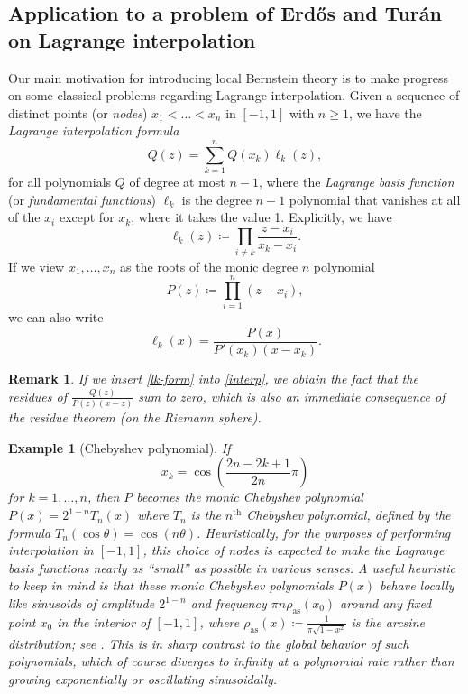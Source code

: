 \documentclass[12pt]{amsart}
\newtheorem{remark}[theorem]{Remark}
\newtheorem{example}[theorem]{Example}
\begin{document}
\subsection{Application to a problem of Erd\H{o}s and Tur\'an on Lagrange interpolation}

Our main motivation for introducing local Bernstein theory is to make progress on some classical problems regarding Lagrange interpolation.
Given a sequence of distinct points (or \emph{nodes}) $x_1 < \dots <x_n$ in $[-1, 1]$ with $n \geq 1$, we have the \emph{Lagrange
interpolation formula}
\begin{equation}\label{interp}
Q(z) = \sum_{k=1}^n Q(x_k) \ell_k(z),
\end{equation}
for all polynomials $Q$ of degree at most $n-1$, where the \emph{Lagrange basis function} (or \emph{fundamental functions}) $\ell_k$ is the
degree $n-1$ polynomial that vanishes at all of the $x_i$ except for $x_k$, where it takes the value
1. Explicitly, we have
\begin{equation}\label{lk-def}
\ell_k(z) \coloneqq \prod_{i \neq k} \frac{z - x_i}{x_k - x_i}.
\end{equation}
If we view $x_1,\dots,x_n$ as the roots of the monic degree $n$ polynomial
\begin{equation}\label{poly-def}
    P(z) \coloneqq \prod_{i=1}^n (z - x_i),
\end{equation}
we can also write
\begin{equation}\label{lk-form}
 \ell_k(x) = \frac{P(x)}{P'(x_k) (x-x_k)}.
\end{equation}

\begin{remark}\label{res} If we insert \eqref{lk-form} into \eqref{interp}, we obtain the fact that the residues of $\frac{Q(z)}{P(z) (x-z)}$ sum to zero, which is also an immediate consequence of the residue theorem (on the Riemann sphere).
\end{remark}

\begin{example}[Chebyshev polynomial]\label{cheby} If
$$x_k = \cos \left( \frac{2n-2k+1}{2n} \pi \right)$$
for $k=1,\dots,n$, then $P$ becomes the \emph{monic Chebyshev polynomial} $P(x) = 2^{1-n} T_n(x)$ where $T_n$ is the $n^{\operatorname{th}}$ Chebyshev polynomial, defined by the formula $T_n(\cos \theta) = \cos(n \theta)$.  Heuristically, for the purposes of performing interpolation in $[-1,1]$, this choice of nodes is expected to make the Lagrange basis functions nearly as ``small'' as possible in various senses.  A useful heuristic to keep in mind is that these monic Chebyshev polynomials $P(x)$ behave locally like sinusoids of amplitude $2^{1-n}$ and frequency $\pi n \rho_{\mathrm{as}}(x_0)$ around any fixed point $x_0$ in the interior of $[-1,1]$, where $\rho_{\mathrm{as}}(x) \coloneqq \frac{1}{\pi \sqrt{1-x^2}}$ is the arcsine distribution; see .  This is in sharp contrast to the global behavior of such polynomials, which of course diverges to infinity at a polynomial rate rather than growing exponentially or oscillating sinusoidally.
\end{example}
\end{document}
